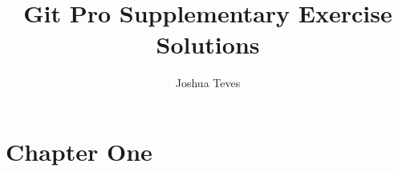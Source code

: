 \documentclass{report}
\title{Git Pro Supplementary Exercise Solutions}
\author{Joshua Teves}
\begin{document}
\maketitle

\chapter{Chapter One}

\end{document}
